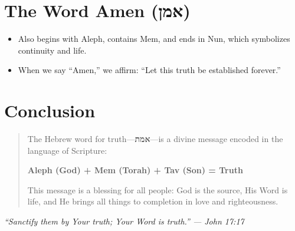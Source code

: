 \documentclass[12]{amsart}
\theoremstyle{plain}
\begin{document}
\section*{The Word \textbf{Amen} (אמן)}
\begin{itemize}
  \item Also begins with Aleph, contains Mem, and ends in Nun, which symbolizes continuity and life.
  \item When we say “Amen,” we affirm: “Let this truth be established forever.”
\end{itemize}

\section*{Conclusion}
\begin{quote}
The Hebrew word for truth—\textbf{אמת}—is a divine message encoded in the language of Scripture:

\begin{center}
\textbf{Aleph (God) + Mem (Torah) + Tav (Son) = Truth}
\end{center}

This message is a blessing for all people: God is the source, His Word is life, and He brings all things to completion in love and righteousness.
\end{quote}

\vspace{1em}
\begin{center}
\textit{“Sanctify them by Your truth; Your Word is truth.” — John 17:17}
\end{center}
\end{document}
